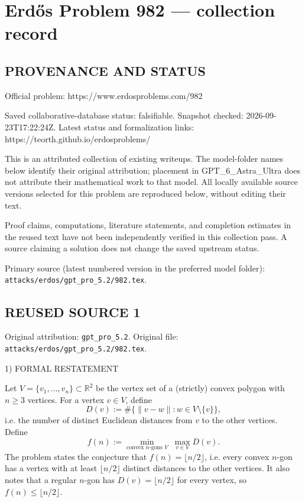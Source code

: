 \section*{Erd\H{o}s Problem 982 --- collection record}

\subsection*{PROVENANCE AND STATUS}
Official problem: https://www.erdosproblems.com/982

Saved collaborative-database status: falsifiable.
Snapshot checked: 2026-09-23T17:22:24Z.
Latest status and formalization links: https://teorth.github.io/erdosproblems/

This is an attributed collection of existing writeups. The model-folder names below identify their original attribution; placement in GPT\_6\_Astra\_Ultra does not attribute their mathematical work to that model. All locally available source versions selected for this problem are reproduced below, without editing their text.

Proof claims, computations, literature statements, and completion estimates in the reused text have not been independently verified in this collection pass. A source claiming a solution does not change the saved upstream status.

Primary source (latest numbered version in the preferred model folder): \texttt{attacks/erdos/gpt\_pro\_5.2/982.tex}.

\subsection*{REUSED SOURCE 1}
Original attribution: \texttt{gpt\_pro\_5.2}.
Original file: \texttt{attacks/erdos/gpt\_pro\_5.2/982.tex}.


1) FORMAL RESTATEMENT

Let $V=\{v_1,\dots,v_n\}\subset\mathbb R^2$ be the vertex set of a (strictly) convex polygon with $n\ge 3$ vertices.
For a vertex $v\in V$, define
\[
D(v):=\#\bigl\{\|v-w\|: w\in V\setminus\{v\}\bigr\},
\]
i.e. the number of distinct Euclidean distances from $v$ to the other vertices.
Define
\[
f(n):=\min_{\text{convex }n\text{-gons }V}\;\max_{v\in V} D(v).
\]
The problem states the conjecture that $f(n)=\lfloor n/2\rfloor$, i.e. every convex $n$-gon has a vertex with at least $\lfloor n/2\rfloor$ distinct distances to the other vertices.
It also notes that a regular $n$-gon has $D(v)=\lfloor n/2\rfloor$ for every vertex, so $f(n)\le \lfloor n/2\rfloor$.


